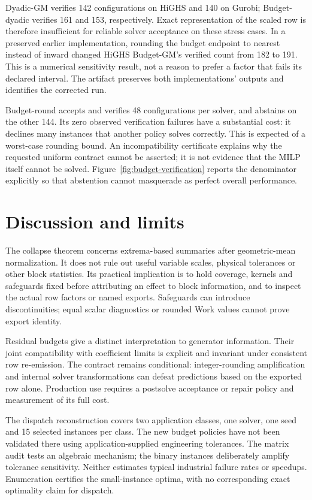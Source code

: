 \documentclass[11pt]{article}
\theoremstyle{definition}
\theoremstyle{remark}
\begin{document}
Dyadic-GM verifies 142 configurations on HiGHS and 140 on Gurobi;
Budget-dyadic verifies 161 and 153, respectively. Exact representation of the scaled
row is therefore insufficient for reliable solver acceptance on these stress cases.
In a preserved earlier implementation, rounding the budget endpoint to nearest instead
of inward changed HiGHS Budget-GM's verified count from 182 to 191. This is a numerical
sensitivity result, not a reason to prefer a factor that fails its declared interval.
The artifact preserves both implementations' outputs and identifies the corrected run.

Budget-round accepts and verifies 48 configurations per solver, and abstains on the
other 144. Its zero observed verification failures have a substantial cost: it declines
many instances that another policy solves correctly. This is expected of a worst-case
rounding bound. An incompatibility certificate explains why the requested uniform
contract cannot be asserted; it is not evidence that the MILP itself cannot be solved.
Figure~\ref{fig:budget-verification} reports the denominator explicitly so that abstention
cannot masquerade as perfect overall performance.



\section{Discussion and limits}
\label{sec:discussion}
The collapse theorem concerns extrema-based summaries after geometric-mean
normalization. It does not rule out useful variable scales, physical tolerances or
other block statistics. Its practical implication is to hold coverage, kernels and
safeguards fixed before attributing an effect to block information, and to inspect
the actual row factors or named exports. Safeguards can introduce discontinuities;
equal scalar diagnostics or rounded Work values cannot prove export identity.

Residual budgets give a distinct interpretation to generator information. Their joint
compatibility with coefficient limits is explicit and invariant under consistent
row re-emission. The contract remains conditional: integer-rounding amplification
and internal solver transformations can defeat predictions based on the exported
row alone. Production use requires a postsolve acceptance or repair policy and
measurement of its full cost.

The dispatch reconstruction covers two application classes, one solver, one seed and
15 selected instances per class. The new budget policies have not been validated
there using application-supplied engineering tolerances. The matrix audit tests an
algebraic mechanism; the binary instances deliberately amplify tolerance sensitivity.
Neither estimates typical industrial failure rates or speedups. Enumeration certifies
the small-instance optima, with no corresponding exact optimality claim for dispatch.
\end{document}
